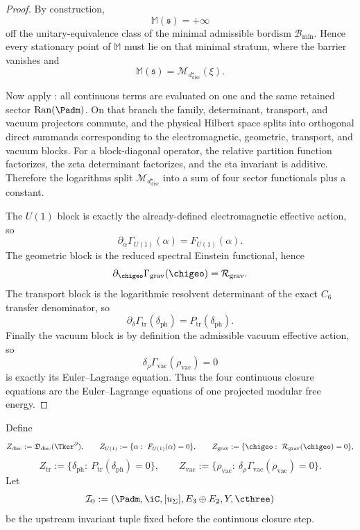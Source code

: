 \begin{proof}
By construction,
\[
\mathbb M(\mathfrak s)=+\infty
\]
off the unitary-equivalence class of the minimal admissible bordism $\mathcal B_{\min}$. Hence every
stationary point of $\mathbb M$ must lie on that minimal stratum, where the barrier vanishes and
\[
\mathbb M(\mathfrak s)=\mathcal M_{d^\star_{\mathrm{disc}}}(\xi).
\]

Now apply : all continuous terms are evaluated on one and the
same retained sector $\operatorname{Ran}(\Padm)$. On that branch the family, determinant, transport,
and vacuum projectors commute, and the physical Hilbert space splits into orthogonal direct summands
corresponding to the electromagnetic, geometric, transport, and vacuum blocks. For a block-diagonal
operator, the relative partition function factorizes, the zeta determinant factorizes, and the eta
invariant is additive. Therefore the logarithms split $\mathcal M_{d^\star_{\mathrm{disc}}}$ into a
sum of four sector functionals plus a constant.

The $U(1)$ block is exactly the already-defined electromagnetic effective action, so
\[
\partial_\alpha\Gamma_{U(1)}(\alpha)=F_{U(1)}(\alpha).
\]
The geometric block is the reduced spectral Einstein functional, hence
\[
\partial_{\chigeo}\Gamma_{\mathrm{grav}}(\chigeo)=\mathcal R_{\mathrm{grav}}.
\]
The transport block is the logarithmic resolvent determinant of the exact $C_6$ transfer
denominator, so
\[
\partial_\delta\Gamma_{\mathrm{tr}}(\delta_{\mathrm{ph}})
=
P_{\mathrm{tr}}(\delta_{\mathrm{ph}}).
\]
Finally the vacuum block is by definition the admissible vacuum effective action, so
\[
\delta_\rho\Gamma_{\mathrm{vac}}(\rho_{\mathrm{vac}})=0
\]
is exactly its Euler--Lagrange equation. Thus the four continuous closure equations are the
Euler--Lagrange equations of one projected modular free energy.
\end{proof}

\begin{definition}
\label{def:intrinsic-closure-map}
\label{def:core-closure-functional}
\label{def:sector-solution-sets}
Define
\[
Z_{\mathrm{disc}}:=\mathfrak D_{\mathrm{disc}}(\Tker^\partial),
\qquad
Z_{U(1)}:=\{\alpha:\ F_{U(1)}(\alpha)=0\},
\qquad
Z_{\mathrm{grav}}:=\{\chigeo:\ \mathcal R_{\mathrm{grav}}(\chigeo)=0\},
\]
\[
Z_{\mathrm{tr}}:=\{\delta_{\mathrm{ph}}:\ P_{\mathrm{tr}}(\delta_{\mathrm{ph}})=0\},
\qquad
Z_{\mathrm{vac}}:=\{\rho_{\mathrm{vac}}:\ \delta_\rho\Gamma_{\mathrm{vac}}(\rho_{\mathrm{vac}})=0\}.
\]
Let
\[
\mathcal I_0
:=
(\Padm,\iC,[u_\Sigma],E_3\oplus E_2,Y,\cthree)
\]
be the upstream invariant tuple fixed before the continuous closure step.
\end{definition}

